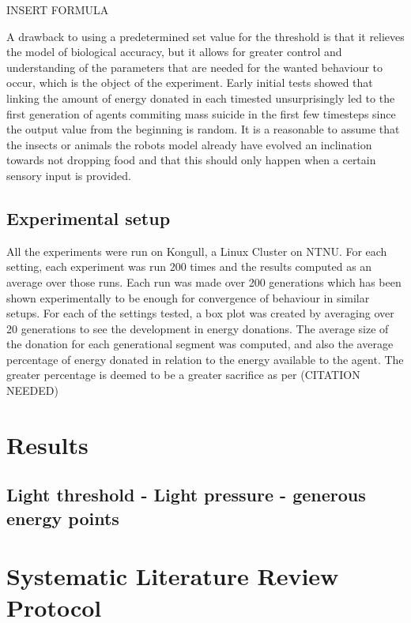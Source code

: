 \documentclass[a4paper]{book}
\begin{document}
INSERT FORMULA

A drawback to using a predetermined set value for the threshold is that it relieves the model of biological accuracy, but it allows for greater control and understanding of the parameters 
that are needed for the wanted behaviour to occur, which is the object of the experiment. Early initial tests showed that linking the amount of energy donated in each timested unsurprisingly 
led to the first generation of agents commiting mass suicide in the first few timesteps since the output value from the beginning is random. It is a reasonable to assume that the insects or
animals the robots model already have evolved an inclination towards not dropping food and that this should only happen when a certain sensory input is provided.   
 
\section{Experimental setup}

All the experiments were run on Kongull, a Linux Cluster on NTNU. For each setting, each experiment was run 200 times and the results computed as an average over those runs. 
Each run was made over 200 generations which has been shown experimentally to be enough for convergence of behaviour in similar setups. 
For each of the settings tested, a box plot was created by averaging over 20 generations to see the development in energy donations. The average size of the donation
for each generational segment was computed, and also the average percentage of energy donated in relation to the energy available to the agent. The greater percentage 
is deemed to be a greater sacrifice as per (CITATION NEEDED) 

\chapter{Results}

\section{Light threshold - Light pressure - generous energy points}





\chapter{Systematic Literature Review Protocol}\label{T-B}
\label{cha:STL}
\end{document}
